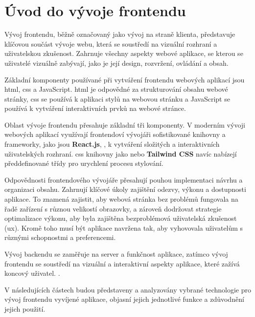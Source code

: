 \section{Úvod do vývoje frontendu}
\label{sec:implementace-uvod}
Vývoj frontendu, běžně označovaný jako vývoj na straně klienta, představuje klíčovou součást vývoje webu, která se soustředí na vizuální rozhraní a uživatelskou zkušenost.
Zahrnuje všechny aspekty webové aplikace, se kterou se uživatelé vizuálně zabývají, jako je její design, rozvržení, ovládání a obsah.

Základní komponenty používané při vytváření frontendu webových aplikací jsou \ac{html}, \ac{css} a JavaScript.
\ac{html} je odpovědné za strukturování obsahu webové stránky, \ac{css} se používá k aplikaci stylů na webovou stránku a JavaScript se používá k vytváření interaktivních prvků na webové stránce\cite{mdn_getting_started_with_the_web}.

Oblast vývoje frontendu přesahuje základní tři komponenty.
V moderním vývoji webových aplikací využívají frontendoví vývojáři sofistikované knihovny a frameworky, jako jsou \textbf{React.js}, ,  k vytváření složitých a interaktivních uživatelských rozhraní\cite{mdn_tools_and_testing_client_side_javascript_frameworks_introduction}.
\ac{css} knihovny jako  nebo \textbf{Tailwind CSS} navíc nabízejí předdefinované třídy pro urychlení procesu stylování\cite{bs_guide_top_css_frameworks}.

Odpovědnosti frontendového vývojáře přesahují pouhou implementaci návrhu a organizaci obsahu.
Zahrnují klíčové úkoly zajištění odezvy, výkonu a dostupnosti aplikace.
To znamená zajistit, aby webová stránka bez problémů fungovala na řadě zařízení s různou velikostí obrazovky, a zároveň dodržovat strategie optimalizace výkonu, aby byla zajištěna bezproblémová uživatelská zkušenost (\ac{ux}).
Kromě toho musí být aplikace navržena tak, aby vyhovovala uživatelům s různými schopnostmi a preferencemi\cite{mdn_front_end_web_developer}.

Vývoj backendu se zaměřuje na server a funkčnost aplikace, zatímco vývoj frontendu se soustředí na vizuální a interaktivní aspekty aplikace, které zažívá koncový uživatel.
\cite{mdn_server_side_first_steps_introduction}.

V následujících částech budou představeny a analyzovány vybrané technologie pro vývoj frontendu vyvíjené aplikace, objasní jejich jednotlivé funkce a zdůvodnění jejich použití.
\pagebreak
